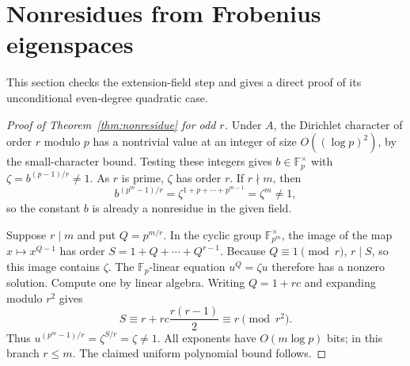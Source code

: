 \documentclass[11pt]{article}
\newcommand{\F}{\mathbb F}
\theoremstyle{definition}
\theoremstyle{remark}
\begin{document}
\section{Nonresidues from Frobenius eigenspaces}
This section checks the extension-field step and gives a direct proof
of its unconditional even-degree quadratic case.

\begin{proof}[Proof of Theorem~\ref{thm:nonresidue} for odd $r$]
Under $A$, the Dirichlet character of order $r$ modulo $p$
has a nontrivial value at an integer of size $O((\log p)^2)$,
by the small-character bound.  Testing these integers gives
$b\in\F_p^\times$ with $\zeta=b^{(p-1)/r}\ne1$.
As $r$ is prime, $\zeta$ has order $r$.
If $r\nmid m$, then
\[
 b^{(p^m-1)/r}=\zeta^{1+p+\cdots+p^{m-1}}=\zeta^m\ne1,
\]
so the constant $b$ is already a nonresidue in the given field.

Suppose $r\mid m$ and put $Q=p^{m/r}$.
In the cyclic group $\F_{p^m}^\times$, the image of the map
$x\mapsto x^{Q-1}$ has order $S=1+Q+\cdots+Q^{r-1}$.
Because $Q\equiv1\pmod r$, $r\mid S$, so this image contains
$\zeta$.  The $\F_p$-linear equation $u^Q=\zeta u$ therefore
has a nonzero solution.  Compute one by linear algebra.
Writing $Q=1+rc$ and expanding modulo $r^2$ gives
\[
 S\equiv r+rc\frac{r(r-1)}2\equiv r\pmod{r^2}.
\]
Thus $u^{(p^m-1)/r}=\zeta^{S/r}=\zeta\ne1$.
All exponents have $O(m\log p)$ bits; in this branch $r\le m$.
The claimed uniform polynomial bound follows.
\end{proof}
\end{document}
